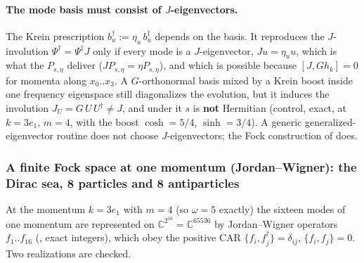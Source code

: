 \paragraph{The mode basis must consist of $J$-eigenvectors.} The Krein prescription
$b_u^{\dagger}:=\eta_u\,b_u^{\ddagger}$ depends on the basis. It reproduces the $J$-involution
$\Psi^{\dagger}=\Psi^{\ddagger}J$ only if every mode is a $J$-eigenvector, $Ju=\eta_u u$, which is what
the $P_{s,\eta}$ deliver ($JP_{s,\eta}=\eta P_{s,\eta}$), and which is possible because
$[J,Gh_k]=0$ for momenta along $x_0..x_3$. A $G$-orthonormal basis mixed by a Krein boost inside one
frequency eigenspace still diagonalizes the evolution, but it induces the involution
$J_U=G\,U\,U^{\dagger}\neq J$, and under it $s$ is \textbf{not} Hermitian (control, exact, at $k=3e_1$,
$m=4$, with the boost $\cosh=5/4$, $\sinh=3/4$). A generic generalized-eigenvector routine does not
choose $J$-eigenvectors; the Fock construction of  does. 

\subsubsection{A finite Fock space at one momentum (Jordan--Wigner): the Dirac sea, 8 particles and 8 antiparticles}
\label{sec:3.5.14}

At the momentum $k=3e_1$ with $m=4$ (so $\omega=5$ exactly) the sixteen modes of one momentum are
represented on $\mathbb C^{2^{16}}=\mathbb C^{65536}$ by Jordan--Wigner operators $f_1..f_{16}$
(, exact integers), which obey the positive CAR $\{f_i,f_j^{\dagger}\}=\delta_{ij}$,
$\{f_i,f_j\}=0$. Two realizations are checked.

